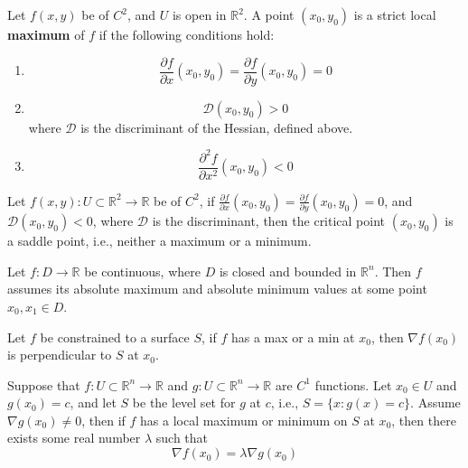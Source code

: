 \documentclass[openany]{book}
\newcommand{\R}{\mathbb{R}}
\begin{document}
\begin{prop}
    Let $f(x,y)$ be of $C^2$, and $U$ is open in $\R^2$. A point $(x_0,y_0)$ is a strict local \textbf{maximum} of $f$ if the following conditions hold:
    \begin{enumerate}
        \item \begin{equation*}
            \frac{\partial f}{\partial x}(x_0,y_0)=\frac{\partial f}{\partial y}(x_0,y_0)=0
        \end{equation*}
        \item \begin{equation*}
            \mathcal{D}(x_0,y_0)>0
        \end{equation*}
        where $\mathcal{D}$ is the {discriminant} of the Hessian, defined above.
        \item  \begin{equation*}
            \frac{\partial^2f}{\partial x^2}(x_0,y_0)<0
        \end{equation*}
    \end{enumerate}
\end{prop}

\begin{prop}
    Let $f(x,y):U\subset\R^2\to \R$ be of  $C^2$, if $\frac{\partial f}{\partial x}(x_0,y_0)=\frac{\partial f}{\partial y}(x_0,y_0)=0$, and $\mathcal{D}(x_0,y_0)<0$, where $\mathcal{D}$ is the discriminant, then the critical point $(x_0,y_0)$ is a saddle point, i.e., neither a maximum or a minimum.
\end{prop}


\begin{prop}
    Let $f:D\to\R$ be continuous, where $D$ is closed and bounded in $\R^n$. Then $f$ assumes its absolute maximum and absolute minimum values at some point $x_0, x_1\in D$.
\end{prop}









\begin{prop}
    Let $f$ be constrained to a surface $S$, if $f$ has a max or a min at $x_0$, then $\nabla f(x_0)$ is perpendicular to $S$ at $x_0$.    
\end{prop}

\begin{prop}[Lagrange]
    Suppose that $f:U\subset\R^n\to\R$ and $g:U\subset\R^n\to\R$ are $C^1$ functions. Let $x_0\in U$ and $g(x_0)=c$, and let $S$ be the level set for $g$ at $c$, i.e., $S=\{x: g(x)=c\}$. Assume $\nabla g(x_0)\neq 0$, then if $f$ has a local maximum or minimum on $S$ at $x_0$, then there exists some real number $\lambda$ such that
    \begin{equation*}
        \nabla f(x_0)=\lambda \nabla g(x_0)
    \end{equation*}
\end{prop}
\end{document}
